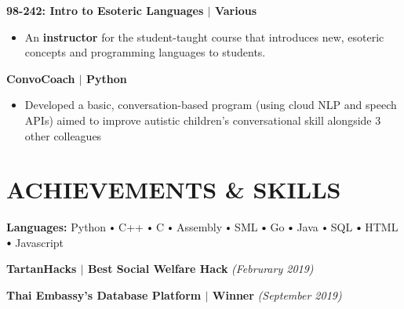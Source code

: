 \documentclass[10pt]{article}
\newcommand\sbullet[1][.5]{\mathbin{\vcenter{\hbox{\scalebox{#1}{$\bullet$}}}}}
\begin{document}
  \textbf{\large {98-242: Intro to Esoteric Languages} $\mid$ Various} 
  \vspace*{-0.17cm}
  \begin{itemize}
    \itemsep0em
    \item \textcolor{lighterG}{An \textbf{instructor} for the student-taught course that introduces new, esoteric concepts and programming languages to students}.
  \end{itemize}

  \textbf{\large ConvoCoach $\mid$ Python} 
  \vspace*{-0.17cm}
  \begin{itemize}
    \itemsep-0.4em
    \item \textcolor{lighterG}{Developed a basic, conversation-based program (using cloud NLP and speech APIs) aimed to improve autistic children's conversational skill alongside 3 other colleagues}
  \end{itemize}


  \section*{\large \textcolor{lighterB}{ACHIEVEMENTS \& SKILLS}}
  \vspace*{-0.3cm}

    \textbf{Languages:}
    Python $\sbullet[.75]$ 
    C++ $\sbullet[.75]$
    C $\sbullet[.75]$ 
    Assembly $\sbullet[.75]$ 
    SML $\sbullet[.75]$ 
    Go $\sbullet[.75]$ 
    Java $\sbullet[.75]$
    SQL $\sbullet[.75]$ 
    HTML $\sbullet[.75]$ 
    Javascript

    \vspace{0.1cm}

    \textbf{TartanHacks $\mid$ Best Social Welfare Hack} \hfill \textit{(Februrary 2019)}

    \textbf{Thai Embassy's Database Platform $\mid$ Winner} \hfill \textit{(September 2019)}
\end{document}
